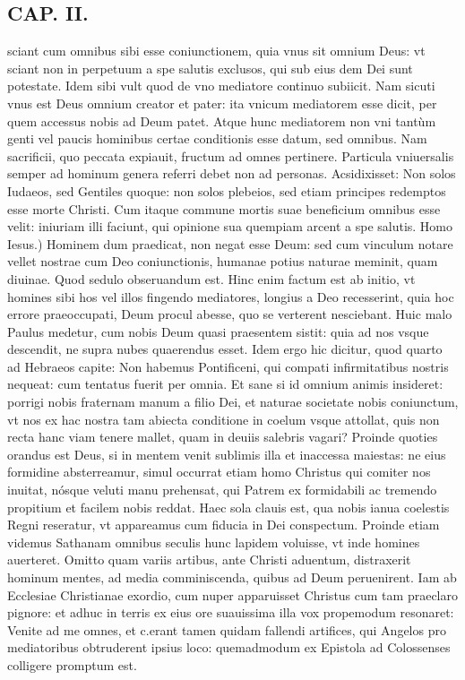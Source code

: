 \documentclass{article}
\begin{document}
\begin{pages}
\section*{CAP. II. }
\marginpar{[ p.21 ]}\pstart sciant cum omnibus sibi esse coniunctionem, quia vnus sit omnium Deus: vt sciant non in perpetuum a spe salutis exclusos, qui sub eius dem Dei sunt potestate. Idem sibi vult quod de vno mediatore continuo subiicit. Nam sicuti vnus est Deus omnium creator et pater: ita vnicum mediatorem esse dicit, per quem accessus nobis ad Deum patet. Atque hunc mediatorem non vni tantùm genti vel paucis hominibus certae conditionis esse datum, sed omnibus. Nam sacrificii, quo peccata expiauit, fructum ad omnes pertinere. Particula vniuersalis semper ad hominum genera referri debet non ad personas. Acsidixisset: Non solos Iudaeos, sed Gentiles quoque: non solos plebeios, sed etiam principes redemptos esse morte Christi. Cum itaque commune mortis suae beneficium omnibus esse velit: iniuriam illi faciunt, qui opinione sua quempiam arcent a spe salutis.  \pend\pstart Homo Iesus.) Hominem dum praedicat, non negat esse Deum: sed cum vinculum notare vellet nostrae cum Deo coniunctionis, humanae potius naturae meminit, quam diuinae. Quod sedulo obseruandum est. Hinc enim factum est ab initio, vt homines sibi hos vel illos fingendo mediatores, longius a Deo recesserint, quia hoc errore praeoccupati, Deum procul abesse, quo se verterent nesciebant. Huic malo Paulus medetur, cum nobis Deum quasi praesentem sistit: quia ad nos vsque descendit, ne supra nubes quaerendus esset. Idem ergo hic dicitur, quod quarto ad Hebraeos capite: Non habemus Pontificeni, qui compati infirmitatibus nostris nequeat: cum tentatus fuerit per omnia. Et sane si id omnium animis insideret: porrigi nobis fraternam manum a filio Dei, et naturae societate nobis coniunctum, vt nos ex hac nostra tam abiecta conditione in coelum vsque attollat, quis non recta hanc viam tenere mallet, quam in deuiis salebris vagari? Proinde quoties orandus est Deus, si in mentem venit sublimis illa et inaccessa maiestas: ne eius formidine absterreamur, simul occurrat etiam homo Christus qui comiter nos inuitat, nósque veluti manu prehensat, qui Patrem ex formidabili ac tremendo propitium et facilem nobis reddat. Haec sola clauis est, qua nobis ianua coelestis Regni reseratur, vt appareamus cum fiducia in Dei conspectum. Proinde etiam videmus Sathanam omnibus seculis hunc lapidem voluisse, vt inde homines auerteret. Omitto quam variis artibus, ante Christi aduentum, distraxerit hominum mentes, ad media comminiscenda, quibus ad Deum peruenirent. Iam ab Ecclesiae Christianae exordio, cum nuper apparuisset Christus cum tam praeclaro pignore: et adhuc in terris ex eius ore suauissima illa vox propemodum resonaret: Venite ad me omnes, et c.erant tamen quidam fallendi artifices, qui Angelos pro mediatoribus obtruderent ipsius loco: quemadmodum ex Epistola ad Colossenses colligere promptum est.  \pend

\end{pages}
\end{document}
